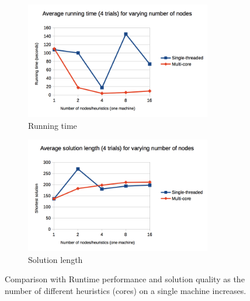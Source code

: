 \documentclass{article}
\begin{document}
\begin{figure}
\centering
\begin{subfigure}{3.2in}
  \includegraphics[width=3.2in]{graphs/singlethreadcomp_runningtime}
  \caption{Running time}
  \label{fig:singthread_runtime}
\end{subfigure}
\begin{subfigure}{3.2in}
  \includegraphics[width=3.2in]{graphs/singlethreadcomp_solutionquality}
  \caption{Solution length}
  \label{fig:singthread_solnqual}
\end{subfigure}
\caption{Comparison with Runtime performance and solution quality as the number of different heuristics (cores) on a single machine increases.}
\label{fig:singthread}
\end{figure}
\end{document}
